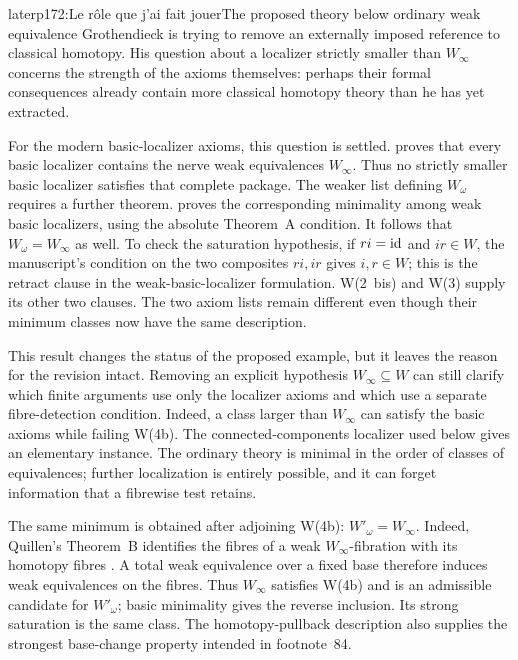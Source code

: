 \begin{dcomment}{later}{p172:Le rôle que j'ai fait jouer}{The proposed theory below ordinary weak equivalence}
Grothendieck is trying to remove an externally imposed reference to classical homotopy. His question about a localizer strictly smaller than $W_\infty$ concerns the strength of the axioms themselves: perhaps their formal consequences already contain more classical homotopy theory than he has yet extracted.

For the modern basic-localizer axioms, this question is settled. \citet[Definition~1.1.3 and Theorem~2.2.11]{Cisinski2004Minimal} proves that every basic localizer contains the nerve weak equivalences $W_\infty$. Thus no strictly smaller basic localizer satisfies that complete package. The weaker list defining $W_\omega$ requires a further theorem. \citet[Theorem~1.10 and Remark~1.11]{Cisinski2009LocallyConstant} proves the corresponding minimality among weak basic localizers, using the absolute Theorem~A condition. It follows that $W_\omega=W_\infty$ as well. To check the saturation hypothesis, if $ri=\mathrm{id}$ and $ir\in W$, the manuscript's condition on the two composites $ri,ir$ gives $i,r\in W$; this is the retract clause in the weak-basic-localizer formulation. W(2~bis) and W(3) supply its other two clauses. The two axiom lists remain different even though their minimum classes now have the same description.

This result changes the status of the proposed example, but it leaves the reason for the revision intact. Removing an explicit hypothesis $W_\infty\subseteq W$ can still clarify which finite arguments use only the localizer axioms and which use a separate fibre-detection condition. Indeed, a class larger than $W_\infty$ can satisfy the basic axioms while failing W(4b). The connected-components localizer used below gives an elementary instance. The ordinary theory is minimal in the order of classes of equivalences; further localization is entirely possible, and it can forget information that a fibrewise test retains.

The same minimum is obtained after adjoining W(4b): $W'_\omega=W_\infty$. Indeed, Quillen's Theorem~B identifies the fibres of a weak $W_\infty$-fibration with its homotopy fibres \citep[Theorem~2.3.2]{Cisinski2004Minimal}. A total weak equivalence over a fixed base therefore induces weak equivalences on the fibres. Thus $W_\infty$ satisfies W(4b) and is an admissible candidate for $W'_\omega$; basic minimality gives the reverse inclusion. Its strong saturation is the same class. The homotopy-pullback description also supplies the strongest base-change property intended in footnote~84.


\end{dcomment}
